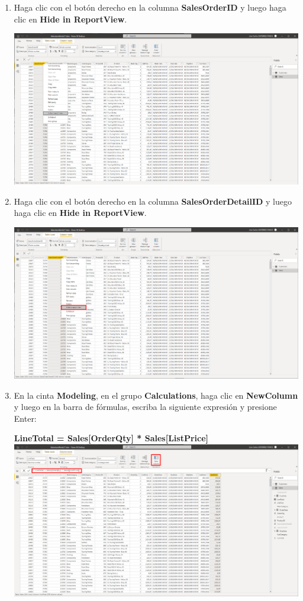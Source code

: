 \documentclass[12pt,letterpaper]{article}
\newcommand\tab[1][1cm]{\hspace*{#1}}
\begin{document}
\begin{enumerate}[\tab 1.]
\begin{center}
        \end{center}
        \item Haga clic con el botón derecho en la columna \textbf{SalesOrderID} y luego haga clic en \textbf{Hide in ReportView}.
        \begin{center}
            \includegraphics[width=13cm]{./img/img41.png}
        \end{center}
        \item Haga clic con el botón derecho en la columna \textbf{SalesOrderDetailID} y luego haga clic en \textbf{Hide in ReportView}.
        \begin{center}
            \includegraphics[width=13cm]{./img/img42.png}
        \end{center}
        \item En la cinta \textbf{Modeling}, en el grupo \textbf{Calculations}, haga clic en \textbf{NewColumn} y luego en la barra de fórmulas, escriba la siguiente expresión y presione Enter:
        \begin{center}
            \textbf{LineTotal = Sales[OrderQty] * Sales[ListPrice]}
            \includegraphics[width=13cm]{./img/img43.png}

\end{center}
\end{enumerate}
\end{document}
